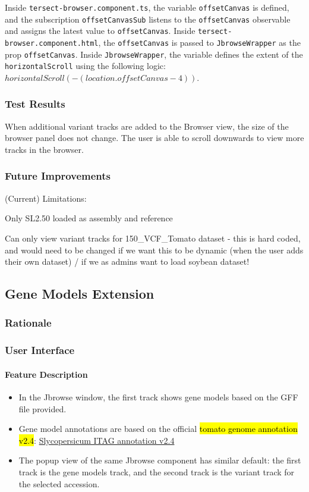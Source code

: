 \documentclass[12pt]{article}
\begin{document}
Inside \verb +tersect-browser.component.ts+, the variable \verb +offsetCanvas+ is defined, and the subscription \verb +offsetCanvasSub+ listens to the  \verb +offsetCanvas+ observable and assigns the latest value to \verb +offsetCanvas+. Inside \verb +tersect-browser.component.html+, the \verb +offsetCanvas+ is passed to \verb +JbrowseWrapper+ as the prop \verb +offsetCanvas+. Inside \verb +JbrowseWrapper+, the variable defines the extent of the \verb +horizontalScroll+ using the following logic: $horizontalScroll(-(location.offsetCanvas - 4))$. 


\subsubsection{Test Results}
When additional variant tracks are added to the Browser view, the size of the browser panel does not change. The user is able to scroll downwards to view more tracks in the browser. 

\subsubsection{Future Improvements}
(Current) Limitations: 

Only SL2.50 loaded as assembly and reference 

Can only view variant tracks for 150\_VCF\_Tomato dataset - this is hard coded, and would need to be changed if we want this to be dynamic (when the user adds their own dataset) / if we as admins want to load soybean dataset!

\subsection{Gene Models Extension}
\label{sec:Models}
\subsubsection{Rationale}
\subsubsection{User Interface}
\paragraph{Feature Description}
\begin{itemize}
    \item In the Jbrowse window, the first track shows gene models based on the GFF file provided.  
    \item Gene model annotations are based on the official \hl{tomato genome annotation v2.4}: \href{https://phytozome-next.jgi.doe.gov/info/Slycopersicum_ITAG2_4#:~:text=Genome%20Overview,genome%2Cwith%2034%2C725%20gene%20models}{Slycopersicum ITAG annotation v2.4}
    \item The popup view of the same Jbrowse component has similar default: the first track is the gene models track, and the second track is the variant track for the selected accession.
\end{itemize}
\end{document}
